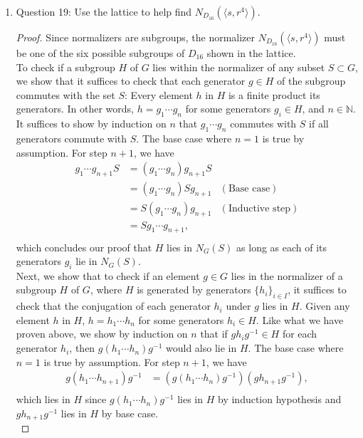\documentclass{article}
\begin{document}
\begin{enumerate}
\begin{enumerate}
\begin{proof}
        \end{proof}

      \item Question 19: Use the lattice to help find $N_{D_{16}}(\langle
        s,r^4\rangle)$.
        \begin{proof}
          Since normalizers are subgroups, the normalizer
          $N_{D_{16}}(\langle s,r^4\rangle)$ must be one of the six
          possible subgroups of $D_{16}$ shown in the lattice. \\

          To check if
          a subgroup $H$ of $G$ lies within the normalizer of any subset
          $S\subset G$, we show that it suffices to check that each
          generator $g\in H$ of the subgroup commutes with the set $S$:
          Every element $h$ in $H$ is a finite product its generators.
          In other words, $h=g_1\cdots g_n$ for some generators
          $g_i\in H$, and $n\in\mathbb{N}$. It suffices to show by
          induction on $n$ that $g_1\cdots g_n$ commutes with $S$ if all
          generators commute with $S$. The base case where $n=1$ is true by
          assumption. For step $n+1$, we have
          \begin{align*}
            g_1\cdots g_{n+1}S  &= (g_1\cdots g_n)g_{n+1}S  & \\
                                &= (g_1\cdots g_n)Sg_{n+1}  & (\text{Base
                                case}) \\
                                &= S(g_1\cdots g_n)g_{n+1}  &
                                (\text{Inductive step}) \\
                                &= Sg_1\cdots g_{n+1},      & \\
          \end{align*}
          which concludes our proof that $H$ lies in $N_G(S)$ as long as
          each of its generators $g_i$ lie in $N_G(S)$. \\

          Next, we show that to check if an element $g\in G$ lies in the
          normalizer of a subgroup $H$ of $G$, where $H$ is generated by
          generators $\{h_i\}_{i\in I}$, it suffices to check that the
          conjugation of each generator $h_i$ under $g$ lies in $H$.
          Given any element $h$ in $H$, $h=h_1\cdots h_n$ for some
          generators $h_i\in H$. Like what we have proven above, we show by
          induction on $n$ that if $gh_ig^{-1}\in H$ for each generator
          $h_i$, then $g(h_1\cdots h_n)g^{-1}$ would also lie in $H$. The
          base case where $n=1$ is true by assumption. For step $n+1$, we
          have
          \begin{align*}
            g(h_1\cdots h_{n+1})g^{-1}  &= (g(h_1\cdots
                                        h_n)g^{-1})(gh_{n+1}g^{-1}), \\
          \end{align*}
          which lies in $H$ since $g(h_1\cdots h_n)g^{-1}$ lies in $H$ by
          induction hypothesis and $gh_{n+1}g^{-1}$ lies in $H$ by base
          case. \\


\end{proof}
\end{enumerate}
\end{enumerate}
\end{document}
